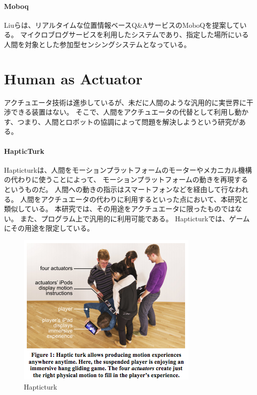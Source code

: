 \paragraph{Moboq}\label{moboq}

\mbox{}

Liuらは、リアルタイムな位置情報ベースQ\&AサービスのMoboQを提案している\cite{moboq}。
マイクロブログサービスを利用したシステムであり、指定した場所にいる人間を対象とした参加型センシングシステムとなっている。

\section{Human as Actuator}\label{human-as-actuator}

アクチュエータ技術は進歩しているが、未だに人間のような汎用的に実世界に干渉できる装置はない。
そこで、人間をアクチュエータの代替として利用し動かす、つまり、人間とロボットの協調によって問題を解決しようという研究がある。

\paragraph{HapticTurk}\label{hapticturk}

\mbox{}

Hapticturk\cite{hapticturk}は、人間をモーションプラットフォームのモーターやメカニカル機構の代わりに使うことによって、
モーションプラットフォームの動きを再現するというものだ。
人間への動きの指示はスマートフォンなどを経由して行なわれる。
人間をアクチュエータの代わりに利用するといった点において、本研究と類似している。
本研究では、その用途をアクチュエータに限ったものではない。
また、プログラム上で汎用的に利用可能である。
Hapticturkでは、ゲームにその用途を限定している。

\begin{figure}[htbp]
  \begin{center}
  \includegraphics[width=.6\linewidth,bb=0 0 332 281]{images/hapticturk.png}
  \end{center}
  \caption{Hapticturk}
  \label{fig:hapticturk}
\end{figure}

